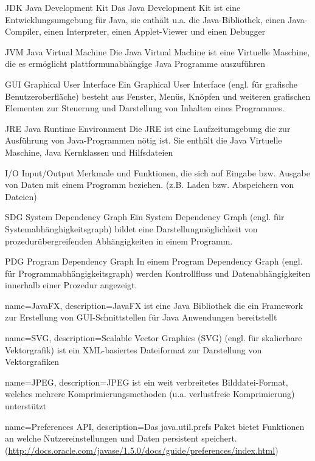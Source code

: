   {JDK}
  {Java Development Kit}
  {Das Java Development Kit ist eine Entwicklungsumgebung für Java, sie enthält u.a. die Java-Bibliothek, einen Java-Compiler, einen Interpreter, einen Applet-Viewer und einen Debugger}

  {JVM}
  {Java Virtual Machine}
  {Die Java Virtual Machine ist eine Virtuelle Maschine, die es ermöglicht plattformunabhängige Java Programme auszuführen}

  {GUI}
  {Graphical User Interface}
  {Ein Graphical User Interface (engl. für grafische Benutzeroberfläche) besteht aus Fenster, Menüs, Knöpfen und weiteren grafischen Elementen zur Steuerung und Darstellung von Inhalten eines Programmes.}

  {JRE}
  {Java Runtime Environment}
  {Die JRE ist eine Laufzeitumgebung die zur Ausführung von Java-Programmen nötig ist. Sie enthält die Java Virtuelle Maschine, Java Kernklassen und Hilfsdateien}

  {I/O}
  {Input/Output}
  {Merkmale und Funktionen, die sich auf Eingabe bzw. Ausgabe von Daten mit einem Programm beziehen. (z.B. Laden bzw. Abspeichern von Dateien)}

  {SDG}
  {System Dependency Graph}
  {Ein System Dependency Graph (engl. für Systemabhänghigkeitsgraph) bildet eine Darstellungmöglichkeit von prozedurübergreifenden Abhängigkeiten in einem Programm.}

  {PDG}
  {Program Dependency Graph}
  {In einem Program Dependency Graph (engl. für Programmabhängigkeitsgraph) werden Kontrollfluss und Datenabhängigkeiten innerhalb einer Prozedur angezeigt.}

{
  name=JavaFX,
  description={JavaFX ist eine Java Bibliothek die ein Framework zur Erstellung von GUI-Schnittstellen für Java Anwendungen bereitstellt}
}

{
  name=SVG,
  description={Scalable Vector Graphics (SVG) (engl. für skalierbare Vektorgrafik) ist ein XML-basiertes Dateiformat zur Darstellung von Vektorgrafiken}
}

{
  name=JPEG,
  description={JPEG ist ein weit verbreitetes Bilddatei-Format, welches mehrere Komprimierungsmethoden (u.a. verlustfreie Komprimierung) unterstützt}
}

{
  name=Preferences API,
  description={Das java.util.prefs Paket bietet Funktionen an welche Nutzereinstellungen und Daten persistent speichert. (\url{http://docs.oracle.com/javase/1.5.0/docs/guide/preferences/index.html})}
}


